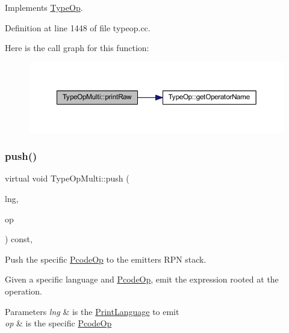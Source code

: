Implements \mbox{\hyperlink{class_type_op_a60717e486917a30cc7cb6e3ce02585e1}{Type\+Op}}.



Definition at line 1448 of file typeop.\+cc.

Here is the call graph for this function\+:
\nopagebreak
\begin{figure}[H]
\begin{center}
\leavevmode
\includegraphics[width=350pt]{class_type_op_multi_a776288910290e0d34a5dbf17893a6789_cgraph}
\end{center}
\end{figure}
\mbox{\label{class_type_op_multi_aa13efcfb7991b09e1c041099aa4773cd}} 
\subsubsection{\texorpdfstring{push()}{push()}}
{\footnotesize\ttfamily virtual void Type\+Op\+Multi\+::push (\begin{DoxyParamCaption}\item[{\mbox{\hyperlink{class_print_language}{Print\+Language}} $\ast$}]{lng,  }\item[{const \mbox{\hyperlink{class_pcode_op}{Pcode\+Op}} $\ast$}]{op }\end{DoxyParamCaption}) const\hspace{0.3cm}{\ttfamily [inline]}, {\ttfamily [virtual]}}



Push the specific \mbox{\hyperlink{class_pcode_op}{Pcode\+Op}} to the emitter\textquotesingle{}s R\+PN stack. 

Given a specific language and \mbox{\hyperlink{class_pcode_op}{Pcode\+Op}}, emit the expression rooted at the operation. 
\begin{DoxyParams}{Parameters}
{\em lng} & is the \mbox{\hyperlink{class_print_language}{Print\+Language}} to emit \\
\hline
{\em op} & is the specific \mbox{\hyperlink{class_pcode_op}{Pcode\+Op}} \\
\hline
\end{DoxyParams}


